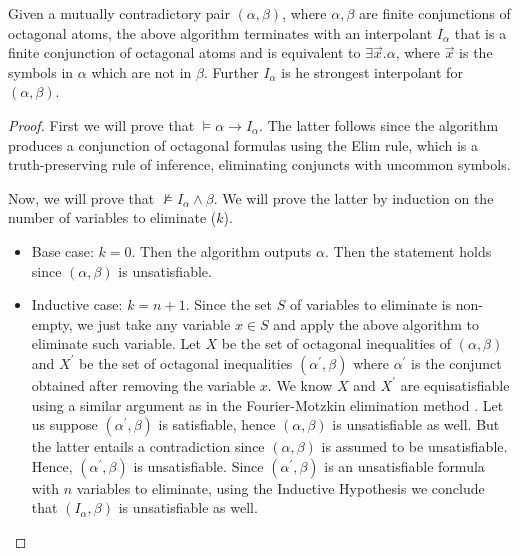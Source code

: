 \begin{theorem}
  Given a mutually contradictory pair $(\alpha, \beta)$,
  where $\alpha, \beta$ are finite conjunctions of octagonal
  atoms, the above algorithm terminates with an interpolant
  $I_\alpha$ that is a finite conjunction of octagonal atoms
  and is equivalent to $\exists \vec{x}. \alpha$, where
  $\vec{x}$ is the symbols in $\alpha$ which are not in
  $\beta$. Further $I_\alpha$ is he strongest interpolant
  for $(\alpha, \beta)$.
\end{theorem}

\begin{proof}
  First we will prove that $\models \alpha \rightarrow I_\alpha$.
  The latter follows since the algorithm produces a
  conjunction of octagonal formulas using the Elim rule,
  which is a truth-preserving rule of inference, eliminating
  conjuncts with uncommon symbols.
  
  Now, we will prove that $\not\models I_\alpha \land \beta$. We
  will prove the latter by induction on the number of variables
  to eliminate ($k$).

  \begin{itemize}
  \item Base case: $k = 0$. Then the algorithm outputs $\alpha$.
    Then the statement holds since $(\alpha, \beta)$
    is unsatisfiable.
  \item Inductive case: $k = n + 1$. Since the set $S$ of variables to eliminate
    is non-empty, we just take any variable $x \in S$ and apply the
    above algorithm to eliminate such variable.
    Let $X$ be the set of octagonal inequalities of $(\alpha, \beta)$
    and $X^{'}$ be the set of octagonal inequalities $(\alpha^{'}, \beta)$
    where $\alpha^{'}$ is the conjunct obtained after removing the
    variable $x$. We know $X$ and $X^{'}$ are equisatisfiable using
    a similar argument as in the Fourier-Motzkin elimination
    method \cite{10.5555/17634}. Let us suppose
    $(\alpha^{'}, \beta)$ is satisfiable, hence $(\alpha, \beta)$
    is unsatisfiable as well. But the latter entails a contradiction
    since $(\alpha, \beta)$ is assumed to be unsatisfiable. Hence,
    $(\alpha^{'}, \beta)$ is unsatisfiable. Since $(\alpha^{'}, \beta)$
    is an unsatisfiable formula with $n$ variables to eliminate,
    using the Inductive Hypothesis we conclude that $(I_\alpha, \beta)$
    is unsatisfiable as well.
  \end{itemize}
  
\end{proof}

